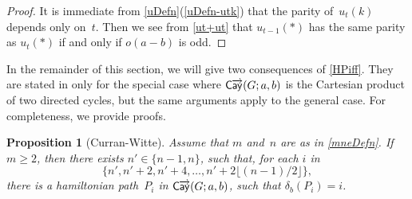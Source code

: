 \documentclass[11pt]{amsart}
\newtheorem{prop}[equation]{Proposition}
\newcommand{\fullcref}[2]{\cref{#1}(\ref{#1-#2})}
\theoremstyle{definition}
\newcounter{case}
\numberwithin{case}{startcases}
\numberwithin{equation}{section}
\newcommand{\cayd}{\mathop{\mathsf{C}\mkern-1mu\overrightarrow{\mathsf{ay}}}}
\begin{document}
	\begin{proof}
		It is immediate from \fullcref{uDefn}{utk} that the parity of~$u_t(k)$ depends only on~$t$. Then we see from \cref{ut+ut} that $u_{t-1}(*)$ has the same parity as $u_t(*)$ if and only if $o(a - b)$ is odd.
	\end{proof}
	
	In the remainder of this section, we will give two consequences of \cref{HPiff}. They are stated in \cite{Curran} only for the special case where $\cayd(G; a,b)$ is the Cartesian product of two directed cycles, but the same arguments apply to the general case. For completeness, we provide proofs.
	
	\begin{prop}[Curran-Witte] \label{string}
		Assume that $m$ and~$n$ are as in \cref{mneDefn}.
		If $m \ge 2$, then there exists $n' \in \{ n - 1, n \}$, such that, for each $i$ in
		\[ \{ n', n' + 2, n' + 4, \ldots, n' + 2 \lfloor (n - 1)/2 \rfloor \} , \]
		there is a hamiltonian path~$P_i$ in $\cayd(G; a,b)$, such that $\delta_b(P_i) = i$.
	\end{prop}
	
\end{document}
